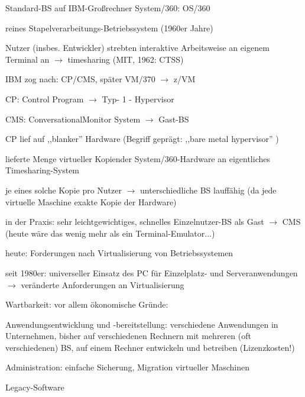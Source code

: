 \documentclass[a4paper]{article}
\begin{document}
\begin{multicols}{3}
\begin{itemize*}
        \begin{itemize*}
            \item Standard-BS auf IBM-Großrechner System/360: OS/360
            \item reines Stapelverarbeitungs-Betriebssystem (1960er Jahre)
            \item Nutzer (insbes. Entwickler) strebten interaktive Arbeitsweise an eigenem Terminal an $\rightarrow$ timesharing (MIT, 1962: CTSS) \begin{itemize*} \item IBM zog nach: CP/CMS, später VM/370 $\rightarrow$ z/VM \item CP: Control Program $\rightarrow$ Typ- 1 - Hypervisor \item CMS: ConversationalMonitor System $\rightarrow$ Gast-BS \end{itemize*}
            \item CP lief auf ,,blanker'' Hardware (Begriff geprägt: ,,bare metal hypervisor'' ) \begin{itemize*} \item lieferte Menge virtueller Kopiender System/360-Hardware an eigentliches Timesharing-System \item je eines solche Kopie pro Nutzer $\rightarrow$ unterschiedliche BS lauffähig (da jede virtuelle Maschine exakte Kopie der Hardware) \item in der Praxis: sehr leichtgewichtiges, schnelles Einzelnutzer-BS als Gast $\rightarrow$ CMS (heute wäre das wenig mehr als ein Terminal-Emulator...) \end{itemize*}
        \end{itemize*}
        \item heute: Forderungen nach Virtualisierung von Betriebssystemen
        \begin{itemize*}
            \item seit 1980er: universeller Einsatz des PC für Einzelplatz- und Serveranwendungen $\rightarrow$ veränderte Anforderungen an Virtualisierung
            \item Wartbarkeit: vor allem ökonomische Gründe: \begin{enumerate*} \item Anwendungsentwicklung und -bereitstellung: verschiedene Anwendungen in Unternehmen, bisher auf verschiedenen Rechnern mit mehreren (oft verschiedenen) BS, auf einem Rechner entwickeln und betreiben (Lizenzkosten!) \item Administration: einfache Sicherung, Migration virtueller Maschinen \item Legacy-Software \end{enumerate*}

\end{itemize*}
\end{itemize*}
\end{multicols}
\end{document}
